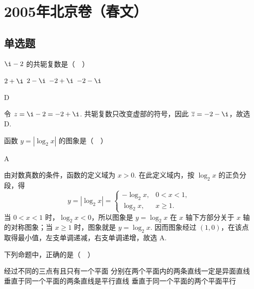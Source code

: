 \chapter{2005年北京卷（春文）}
\section{单选题}
\begin{problem}
\(\i-2\) 的共轭复数是（\(\quad\)）

\choices
    {\(2+\i\)}
    {\(2-\i\)}
    {\(-2+\i\)}
    {\(-2-\i\)}
\end{problem}

\begin{answer}
D
\end{answer}

\begin{solution}
令 \(z=\i-2=-2+\i\). 共轭复数只改变虚部的符号，因此 \(\overline z=-2-\i\)，故选 D.
\end{solution}

\begin{problem}
函数 \(y=|\log_2x|\) 的图象是（\(\quad\)）

\choices
    {}
    {}
    {}
    {}
\end{problem}

\begin{answer}
A
\end{answer}

\begin{solution}
由对数真数的条件，函数的定义域为 \(x>0\). 在此定义域内，按 \(\log_2x\) 的正负分段，得
\[
y=|\log_2x|=\begin{cases}
-\log_2x,&0<x<1,\\
\log_2x,&x\geq 1.
\end{cases}
\]
当 \(0<x<1\) 时，\(\log_2x<0\)，所以图象是 \(y=\log_2x\) 在 \(x\) 轴下方部分关于 \(x\) 轴的对称图象；当 \(x\geq1\) 时，图象就是 \(y=\log_2x\). 因而图象经过 \((1,0)\)，在该点取得最小值，左支单调递减，右支单调递增，故选 A.
\end{solution}

\begin{problem}
下列命题中，正确的是（\(\quad\)）

\choices
    {经过不同的三点有且只有一个平面}
    {分别在两个平面内的两条直线一定是异面直线}
    {垂直于同一个平面的两条直线是平行直线}
    {垂直于同一个平面的两个平面平行}
\end{problem}

